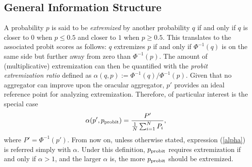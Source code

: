 \documentclass[11pt]{article}
\theoremstyle{definition}
\theoremstyle{definition}
\def\probit{p_{\rm probit}}
\begin{document}
\subsection{General Information Structure}
A probability $p$ is said to be \textit{extremized} by another probability $q$ if and only
if $q$ is closer to $0$ when $p \leq 0.5$ and closer to $1$ when $p
\geq 0.5$. This translates to the associated probit scores as follows: $q$ extremizes $p$ if and only if  $\Phi^{-1}(q)$ is on the same side but further away from zero than $\Phi^{-1}(p)$. The amount of (multiplicative) extremization can then be quantified with the {\em probit extremization ratio} defined as 
 $\alpha(q,p) := \Phi^{-1}(q) / \Phi^{-1} (p)$. Given that no aggregator can improve upon the oracular aggregator, $p'$ provides an ideal
reference point for analyzing extremization. Therefore, of particular interest is the special case
\begin{align}
\alpha(p', \probit)  = \frac{P'}{\frac{1}{N}\sum_{i=1}^N P_{i}}, \label{alpha}
\end{align}
where $P' = \Phi^{-1}(p')$. From now on, unless otherwise stated, expression (\ref{alpha}) is referred simply with
$\alpha$. 
Under this definition, $\probit$
requires extremization if and only if $\alpha > 1$, and the larger $\alpha$ is, the more $\probit$ should be extremized. 
\end{document}
